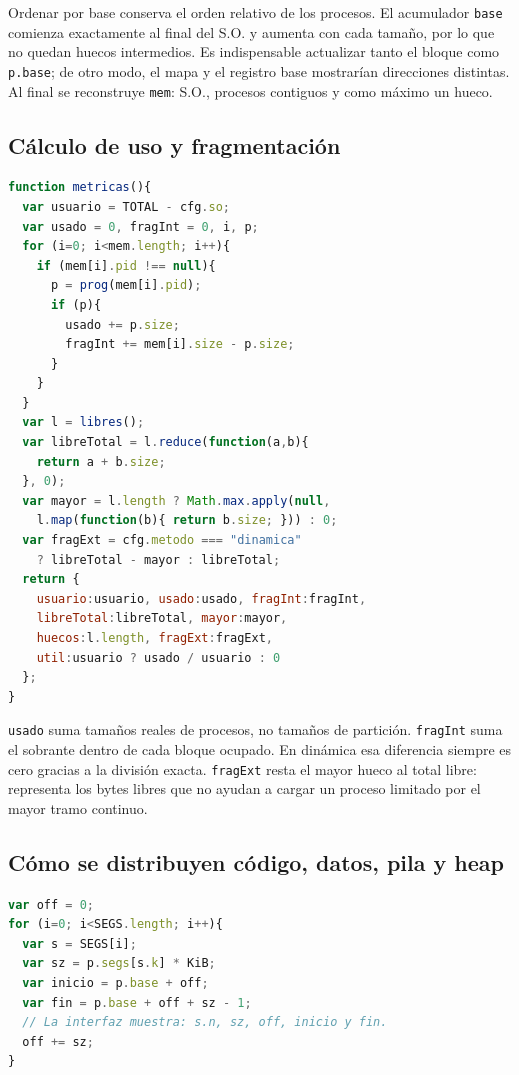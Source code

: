 \documentclass[11pt,a4paper]{article}
\begin{document}
Ordenar por base conserva el orden relativo de los procesos. El acumulador
\texttt{base} comienza exactamente al final del S.O. y aumenta con cada tamaño,
por lo que no quedan huecos intermedios. Es indispensable actualizar tanto el
bloque como \texttt{p.base}; de otro modo, el mapa y el registro base mostrarían
direcciones distintas. Al final se reconstruye \texttt{mem}: S.O., procesos
contiguos y como máximo un hueco.

\subsection{Cálculo de uso y fragmentación}

\begin{lstlisting}[language=JavaScript,caption={Métricas derivadas del estado de memoria.}]
function metricas(){
  var usuario = TOTAL - cfg.so;
  var usado = 0, fragInt = 0, i, p;
  for (i=0; i<mem.length; i++){
    if (mem[i].pid !== null){
      p = prog(mem[i].pid);
      if (p){
        usado += p.size;
        fragInt += mem[i].size - p.size;
      }
    }
  }
  var l = libres();
  var libreTotal = l.reduce(function(a,b){
    return a + b.size;
  }, 0);
  var mayor = l.length ? Math.max.apply(null,
    l.map(function(b){ return b.size; })) : 0;
  var fragExt = cfg.metodo === "dinamica"
    ? libreTotal - mayor : libreTotal;
  return {
    usuario:usuario, usado:usado, fragInt:fragInt,
    libreTotal:libreTotal, mayor:mayor,
    huecos:l.length, fragExt:fragExt,
    util:usuario ? usado / usuario : 0
  };
}
\end{lstlisting}

\texttt{usado} suma tamaños reales de procesos, no tamaños de partición.
\texttt{fragInt} suma el sobrante dentro de cada bloque ocupado. En dinámica esa
diferencia siempre es cero gracias a la división exacta. \texttt{fragExt} resta
el mayor hueco al total libre: representa los bytes libres que no ayudan a cargar
un proceso limitado por el mayor tramo continuo.

\subsection{Cómo se distribuyen código, datos, pila y heap}

\begin{lstlisting}[language=JavaScript,caption={Cálculo de desplazamientos y rangos de cada segmento.}]
var off = 0;
for (i=0; i<SEGS.length; i++){
  var s = SEGS[i];
  var sz = p.segs[s.k] * KiB;
  var inicio = p.base + off;
  var fin = p.base + off + sz - 1;
  // La interfaz muestra: s.n, sz, off, inicio y fin.
  off += sz;
}
\end{lstlisting}
\end{document}
